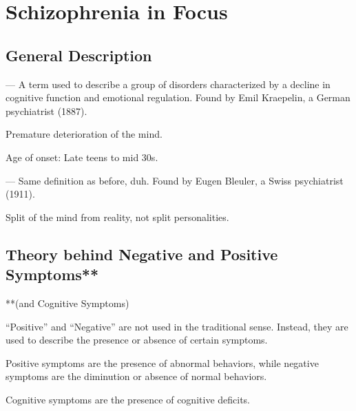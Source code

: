 \section{Schizophrenia in Focus}

\subsection{General Description}

\begin{coloredlist}
    \item {} — A term used to describe a group of disorders characterized by a decline in cognitive function and emotional regulation. Found by Emil Kraepelin, a German psychiatrist (1887).
    \begin{coloredlist}
        \item Premature deterioration of the mind.
    \end{coloredlist}
    \item Age of onset: Late teens to mid 30s.
    \item {} — Same definition as before, duh. Found by Eugen Bleuler, a Swiss psychiatrist (1911).
    \begin{coloredlist}
        \item Split of the mind from reality, not split personalities.
    \end{coloredlist}
\end{coloredlist}

\subsection{Theory behind Negative and Positive Symptoms**}
**(and Cognitive Symptoms)
\begin{coloredlist}
    \item ``Positive'' and ``Negative'' are not used in the traditional sense. Instead, they are used to describe the presence or absence of certain symptoms.
    \begin{coloredlist}
        \item Positive symptoms are the presence of abnormal behaviors, while negative symptoms are the diminution or absence of normal behaviors.
        \item Cognitive symptoms are the presence of cognitive deficits.
    \end{coloredlist}
\end{coloredlist}

